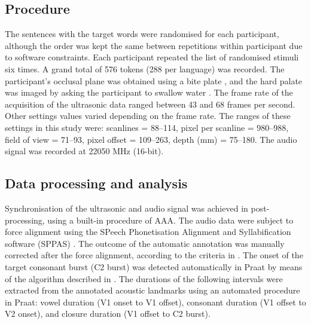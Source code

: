 \documentclass[authoryear, twocolumn]{elsarticle}
\begin{document}
\subsection{Procedure}\label{procedure}

The sentences with the target words were randomised for each
participant, although the order was kept the same between repetitions
within participant due to software constraints. Each participant
repeated the list of randomised stimuli six times. A grand total of 576
tokens (288 per language) was recorded. The participant's occlusal plane
was obtained using a bite plate \citep{scobbie2011}, and the hard palate
was imaged by asking the participant to swallow water
\citep{epstein2005}. The frame rate of the acquisition of the ultrasonic
data ranged between 43 and 68 frames per second. Other settings values
varied depending on the frame rate. The ranges of these settings in this
study were: scanlines = 88--114, pixel per scanline = 980--988, field of
view = 71--93, pixel offset = 109--263, depth (mm) = 75--180. The audio
signal was recorded at 22050 MHz (16-bit).

\subsection{Data processing and
analysis}\label{data-processing-and-analysis}

Synchronisation of the ultrasonic and audio signal was achieved in
post-processing, using a built-in procedure of AAA. The audio data were
subject to force alignment using the SPeech Phonetisation Alignment and
Syllabification software (SPPAS) \citep{bigi2015}. The outcome of the
automatic annotation was manually corrected after the force alignment,
according to the criteria in . The onset of the
target consonant burst (C2 burst) was detected automatically in Praat
\citep{boersma2016} by means of the algorithm described in
\citet{ananthapadmanabha2014}. The durations of the following intervals
were extracted from the annotated acoustic landmarks using an automated
procedure in Praat: vowel duration (V1 onset to V1 offset), consonant
duration (V1 offset to V2 onset), and closure duration (V1 offset to C2
burst).
\end{document}
